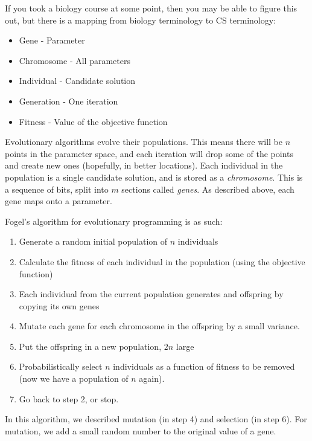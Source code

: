 If you took a biology course at some point, then you may be able to figure this
out, but there is a mapping from biology terminology to CS terminology:

\begin{itemize}
  \item Gene  - Parameter
  \item Chromosome - All parameters
  \item Individual - Candidate solution
  \item Generation - One iteration
  \item Fitness - Value of the objective function
\end{itemize}

Evolutionary algorithms evolve their populations. This means there will be $n$
points in the parameter space, and each iteration will drop some of the points
and create new ones (hopefully, in better locations). Each individual in the 
population is a single candidate solution, and is stored as a
\textit{chromosome}. This is a sequence of bits, split into $m$ sections called
\textit{genes}. As described above, each gene maps onto a parameter.


Fogel's algorithm for evolutionary programming is as such:

\begin{enumerate}
  \item Generate a random initial population of $n$ individuals
  \item Calculate the fitness of each individual in the population (using the
  objective function)
  \item Each individual from the current population generates and offspring by
  copying its own genes
  \item Mutate each gene for each chromosome in the offspring by a small 
  variance.
  \item Put the offspring in a new population, $2n$ large
  \item Probabilistically select $n$ individuals as a function of fitness to be
  removed (now we have a population of $n$ again).
  \item Go back to step 2, or stop.
\end{enumerate}


In this algorithm, we described mutation (in step 4) and selection (in step 6).
For mutation, we add a small random number to the original value of a gene.

